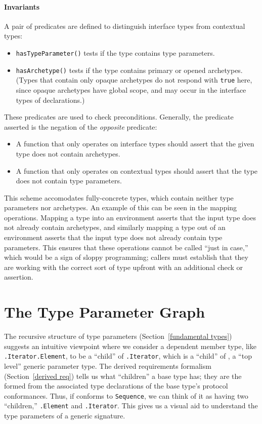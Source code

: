 \documentclass[../generics]{subfiles}
\begin{document}
\paragraph{Invariants} A pair of predicates are defined to distinguish interface types from contextual types:
\begin{itemize}
\item \texttt{hasTypeParameter()} tests if the type contains type parameters.
\item \texttt{hasArchetype()} tests if the type contains primary or opened archetypes. (Types that contain only opaque archetypes do not respond with \texttt{true} here, since opaque archetypes have global scope, and may occur in the interface types of declarations.)
\end{itemize}
These predicates are used to check preconditions. Generally, the predicate asserted is the negation of the \emph{opposite} predicate:
\begin{itemize}
\item A function that only operates on interface types should assert that the given type does not contain archetypes.
\item A function that only operates on contextual types should assert that the type does not contain type parameters.
\end{itemize}
This scheme accomodates fully-concrete types, which contain neither type parameters nor archetypes. An example of this can be seen in the mapping operations. Mapping a type into an environment asserts that the input type does not already contain archetypes, and similarly mapping a type out of an environment asserts that the input type does not already contain type parameters. This ensures that these operations cannot be called ``just in case,'' which would be a sign of sloppy programming; callers must establish that they are working with the correct sort of type upfront with an additional check or assertion.

\section{The Type Parameter Graph}\label{type parameter graph}

The recursive structure of type parameters (Section~\ref{fundamental types}) suggests an intuitive viewpoint where we consider a dependent member type, like \texttt{.Iterator.Element}, to be a ``child'' of \texttt{.Iterator}, which is a ``child'' of , a ``top level'' generic parameter type. The derived requirements formalism (Section~\ref{derived req}) tells us what ``children'' a base type has; they are the formed from the associated type declarations of the base type's protocol conformances. Thus, if  conforms to \texttt{Sequence}, we can think of it as having two ``children,'' \texttt{.Element} and \texttt{.Iterator}. This gives us a visual aid to understand the type parameters of a generic signature.
\end{document}
